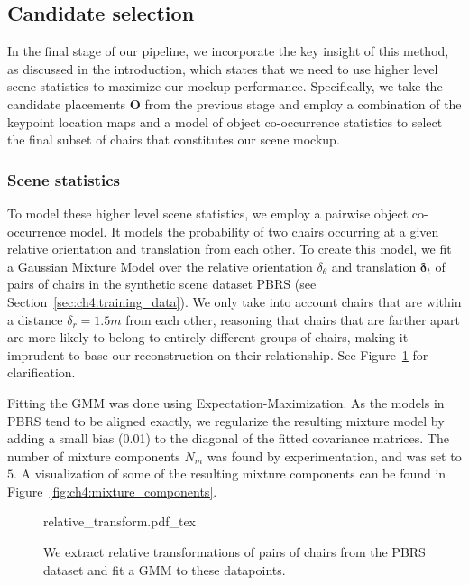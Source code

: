 \documentclass[10pt,twocolumn,letterpaper]{article}
\newcommand{\bb}[1]{{\bm{#1}}}
\begin{document}
\subsection{Candidate selection}
\label{sec:ch4:optimization}
In the final stage of our pipeline, we incorporate the key insight of this
method, as discussed in the introduction, which states that we need to use higher level
scene statistics to maximize our mockup performance.  Specifically, we take the
candidate placements $\bb{O}$ from the previous stage and employ a
combination of the keypoint location maps and a model of object co-occurrence
statistics to select the final subset of chairs that constitutes our scene
mockup.

\subsubsection{Scene statistics}
\label{ssec:ch4:scene_statistics}
To model these higher level scene statistics, we employ a pairwise object
co-occurrence model. It models the probability of two chairs occurring at a given
relative orientation and translation from each other.  To create this model, we
fit a Gaussian Mixture Model over the relative orientation $\delta_\theta$ and translation $\bb{\delta}_t$ of
pairs of chairs in the synthetic scene dataset \textsc{PBRS} (see
Section~\ref{sec:ch4:training_data}). We only take into account chairs that
are within a distance $\delta_r = 1.5m$ from each other, reasoning that chairs
that are farther apart are more likely to belong to entirely different groups
of chairs, making it imprudent to base our reconstruction on their
relationship. See Figure~\ref{fig:ch4:relative_transform} for clarification.

Fitting the GMM was done using Expectation-Maximization. As the models in \textsc{PBRS} tend to be 
aligned exactly, we regularize the resulting mixture model by adding a small bias (0.01) to the diagonal
of the fitted covariance matrices. The number of mixture components $N_m$ was found by experimentation, and was set to $5$.
A visualization of some of the resulting mixture components can be found in Figure~\ref{fig:ch4:mixture_components}.

\begin{figure}
    \def\svgwidth{\linewidth}
    {relative_transform.pdf_tex}
    \caption[GMM visualization]{We extract relative transformations of pairs of chairs from the PBRS dataset and fit a GMM to these datapoints.}
    \label{fig:ch4:relative_transform}
\end{figure}
\end{document}
